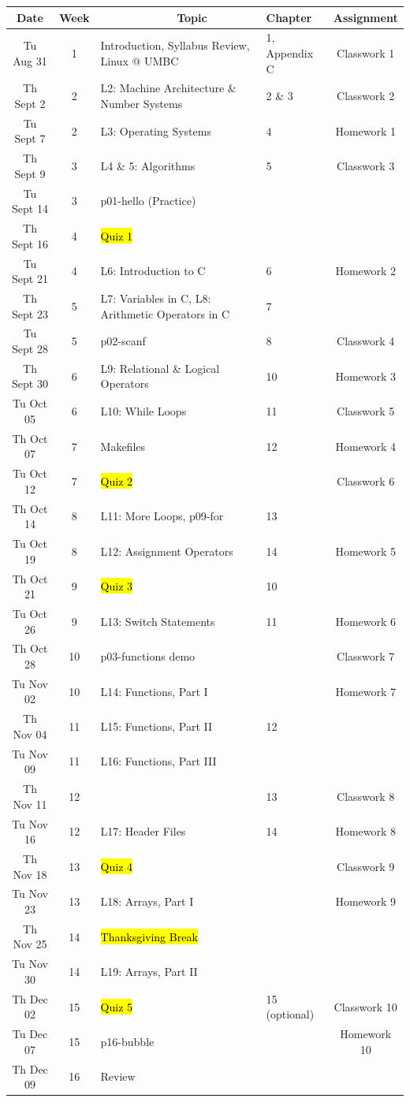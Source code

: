 \documentclass[letter,11pt]{article}
\begin{document}
\small
\begin{tabular}{c c l l c}
Date & Week & ~~~~~~~~~~~~Topic & Chapter & Assignment \\
\hline
Tu Aug 31  & 1 & Introduction, Syllabus Review, Linux @ UMBC & 1, Appendix C & Classwork 1  \\ \hline
Th Sept 2  & 2 & L2: Machine Architecture \& Number Systems & 2 \& 3 & Classwork 2 \\
Tu Sept 7  & 2 & L3: Operating Systems & 4 & Homework 1 \\
Th Sept 9  & 3 & L4 \& 5: Algorithms & 5 & Classwork 3 \\
Tu Sept 14 & 3 & p01-hello (Practice) & &   \\
Th Sept 16 & 4 & \hl{Quiz 1} & &  \\
Tu Sept 21 & 4 & L6: Introduction to C & 6 & Homework 2 \\
Th Sept 23 & 5 & L7: Variables in C, L8: Arithmetic Operators in C & 7 \\
Tu Sept 28 & 5 & p02-scanf & 8 & Classwork 4 \\
Th Sept 30 & 6 & L9: Relational \& Logical Operators & 10 & Homework 3 \\ \hline
Tu Oct 05 & 6 & L10: While Loops & 11 & Classwork 5 \\
Th Oct 07 & 7 & Makefiles & 12 & Homework 4 \\
Tu Oct 12 & 7 & \hl{Quiz 2} & & Classwork 6 \\
Th Oct 14 & 8 & L11: More Loops, p09-for & 13 & \\
Tu Oct 19 & 8 & L12: Assignment Operators & 14 & Homework 5 \\
Th Oct 21 & 9 & \hl{Quiz 3} & 10 \\
Tu Oct 26 & 9 & L13: Switch Statements & 11 & Homework 6 \\
Th Oct 28 & 10 & p03-functions demo   & & Classwork 7 \\ \hline
Tu Nov 02 & 10 & L14: Functions, Part I   & & Homework 7\\
Th Nov 04 & 11 & L15: Functions, Part II  & 12 \\
Tu Nov 09 & 11 & L16: Functions, Part III & &  \\
Th Nov 11 & 12 &  & 13 & Classwork 8 \\
Tu Nov 16 & 12 & L17: Header Files & 14 & Homework 8 \\
Th Nov 18 & 13 & \hl{Quiz 4} & & Classwork 9 \\
Tu Nov 23 & 13 & L18: Arrays, Part I & & Homework 9\\
Th Nov 25 & 14 & \hl{Thanksgiving Break} &  & \\
Tu Nov 30 & 14 & L19: Arrays, Part II &  \\ \hline
Th Dec 02 & 15 & \hl{Quiz 5} & 15 (optional) & Classwork 10 \\
Tu Dec 07 & 15 & p16-bubble & & Homework 10 \\
Th Dec 09 & 16 & Review &  \\
\end{tabular}
\end{document}
